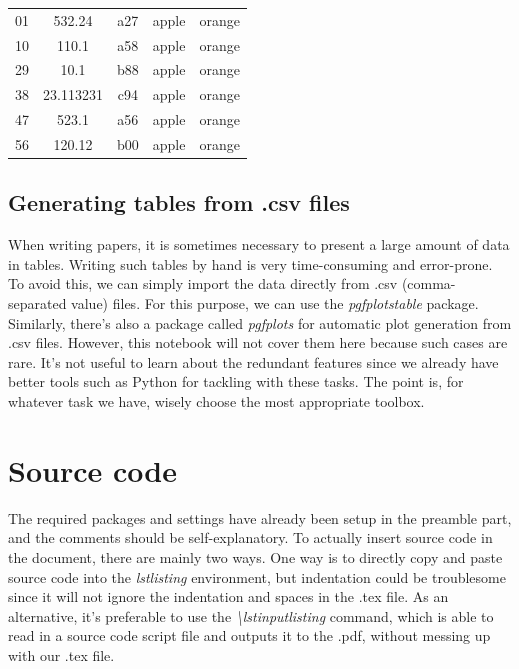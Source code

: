 \documentclass[11pt]{article}  %
\begin{document}
\begin{longtable}[c]{c|S|c|c|c}
        01               & 532.24           & a27              & apple            & orange \\
        10               & 110.1            & a58              & apple            & orange \\
        29               & 10.1             & b88              & apple            & orange \\
        38               & 23.113231        & c94              & apple            & orange \\
        47               & 523.1            & a56              & apple            & orange \\
        56               & 120.12           & b00              & apple            & orange \\
        \bottomrule
      \end{longtable}

    \subsection{Generating tables from .csv files}
      When writing papers, it is sometimes necessary to present a large amount of data in tables. Writing such tables by hand is very time-consuming and error-prone. To avoid this, we can simply import the data directly from .csv (comma-separated value) files. For this purpose, we can use the \textit{pgfplotstable} package. Similarly, there's also a package called \textit{pgfplots} for automatic plot generation from .csv files. However, this notebook will not cover them here because such cases are rare. It's not useful to learn about the redundant features since we already have better tools such as Python for tackling with these tasks. The point is, for whatever task we have, wisely choose the most appropriate toolbox.


  \section{Source code}
    The required packages and settings have already been setup in the preamble part, and the comments should be self-explanatory. To actually insert source code in the document, there are mainly two ways. One way is to directly copy and paste source code into the \textit{lstlisting} environment, but indentation could be troublesome since it will not ignore the indentation and spaces in the .tex file. As an alternative, it's preferable to use the \textit{\textbackslash lstinputlisting} command, which is able to read in a source code script file and outputs it to the .pdf, without messing up with our .tex file.\\
\end{document}
